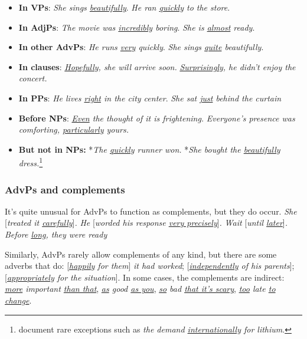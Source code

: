 \begin{itemize}
   \item \textbf{In VPs}: \textit{She sings \uline{beautifully}}. \textit{He ran \uline{quickly} to the store}.
   \item \textbf{In AdjPs}: \textit{The movie was \uline{incredibly} boring}. \textit{She is \uline{almost} ready}.
   \item \textbf{In other AdvPs}: \textit{He runs \uline{very} quickly}.  \textit{She sings \uline{quite} beautifully}.
   \item \textbf{In clauses}: \textit{\uline{Hopefully}, she will arrive soon.} \textit{\uline{Surprisingly}, he didn't enjoy the concert.}
   \item \textbf{In PPs}: \textit{He lives \uline{right} in the city center}. \textit{She sat \uline{just} behind the curtain}
   \item \textbf{Before NPs}: \textit{\uline{Even} the thought of it is frightening.} \textit{Everyone's presence was comforting, \uline{particularly} yours.}
   \item \textbf{But not in NPs:} *\textit{The \uline{quickly} runner won.} *\textit{She bought the \uline{beautifully} dress.}\footnote{\citet{payne2010} document rare exceptions such as \textit{the demand \uline{internationally} for lithium}.}
\end{itemize}

\subsubsection*{AdvPs and complements} \label{sec:AdvPs+Comps}
It's quite unusual for AdvPs to function as complements, but they do occur. \textit{She }[\textit{treated it \uline{carefully}}]\textit{.} \textit{He }[\textit{worded his response \uline{very precisely}}]\textit{.} \textit{Wait }[\textit{until \uline{later}}]\textit{.} \textit{{\ob}Before \uline{long}{\cb}, they were ready}

Similarly, AdvPs rarely allow complements of any kind, but there are some adverbs that do: [\textit{\uline{happily} for them}]\textit{ it had worked}; [\textit{\uline{independently} of his parents}]; [\textit{\uline{appropriately} for the situation}]. In some cases, the complements are indirect: \textit{\uline{more} important \uline{than that}}, \textit{\uline{as} good \uline{as you}}, \textit{\uline{so} bad \uline{that it's scary}}, \textit{\uline{too} late \uline{to change}}.


